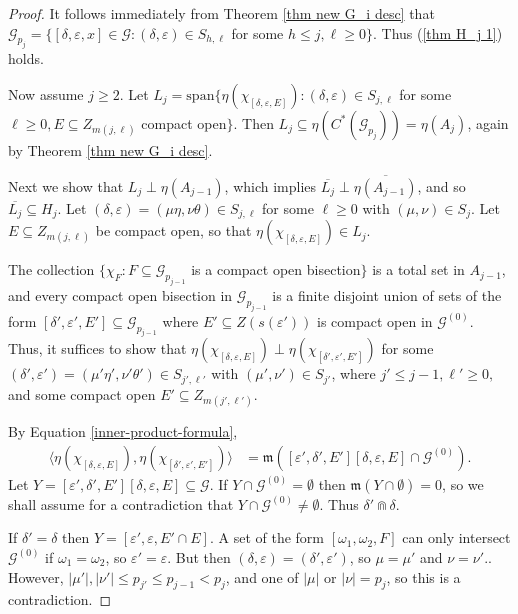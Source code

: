 \documentclass[12pt]{amsart}
\newcommand{\sse}{\subseteq}
\newcommand{\spn}{\text{span}}
\newcommand{\mc}[1]{\mathcal{#1}}
\newcommand{\mf}[1]{\mathfrak{#1}}
\newcommand{\emp}{\emptyset}
\newcommand{\de}{\delta}
\newcommand{\ep}{\varepsilon}
\renewcommand{\th}{\theta}
\newcommand{\om}{\omega}
\theoremstyle{plain} %
\theoremstyle{definition} %
\begin{document}
\begin{proof}
It follows immediately from Theorem \ref{thm new G_i desc} that $\mc{G}_{p_j} = \{ [\de, \ep, x] \in \mc{G} : (\de, \ep) \in S_{h, \ell}$ for some $h \le j, \ell \ge 0\}$. Thus (\ref{thm H_j 1}) holds.

Now assume $j \ge 2$.
Let $L_j = \spn\{\eta(\chi_{[\de, \ep, E]}) : (\de, \ep) \in S_{j,\ell}$ for some $ \ell \ge 0, E \sse Z_{m(j,\ell)} $ compact open$\}.$ 
    Then $L_j \sse \eta(C^*(\mc{G}_{p_j})) = \eta(A_{j})$, again by Theorem \ref{thm new G_i desc}.
    

    Next we show that $L_j \perp \eta(A_{j-1})$, which implies $\overline{L_j} \perp \overline{\eta(A_{j-1})}$, and so $\overline{L_j} \sse H_j$. 
    Let $(\de, \ep) = (\mu\eta, \nu\th) \in S_{j,\ell}$ for some $\ell \ge 0$ with $(\mu, \nu) \in S_{j}$. Let $E \sse Z_{m(j,\ell)}$ be compact open, so that $\eta(\chi_{[\de, \ep, E]}) \in L_j$. 

    The collection $\{\chi_{F} : F \sse \mc{G}_{p_{j-1}}$ is a compact open bisection$\}$ is a total set in $A_{j-1}$, and every compact open bisection in $\mc{G}_{p_{j-1}}$ is a finite disjoint union of sets of the form $[\de', \ep', E'] \sse \mc{G}_{p_{j-1}}$ where $E' \sse Z(s(\ep'))$ is compact open in $\mc{G}^{(0)}$. Thus, it suffices to show that $\eta(\chi_{[\de, \ep, E]}) \perp \eta(\chi_{[\de', \ep', E']})$ for some $(\de', \ep') = (\mu'\eta', \nu'\th') \in S_{j', \ell'}$  with $(\mu', \nu') \in S_{j'}$, where $j' \le j-1, \ell' \ge 0,$  and some compact open $E' \sse Z_{m(j',\ell')}$.

    By Equation \eqref{inner-product-formula},
    \begin{align*}
        \langle \eta(\chi_{[\de, \ep, E]}), \eta(\chi_{[\de', \ep', E']}) \rangle &= \mf{m}([\ep', \de', E'][\de, \ep, E] \cap \mc{G}^{(0)}).
    \end{align*}
    Let $Y = [\ep', \de', E'][\de, \ep, E] \sse \mc{G}$. If $Y \cap \mc{G}^{(0)} = \emp$ then $\mf{m}(Y \cap \emp) = 0$, so we shall assume for a contradiction that $Y \cap \mc{G}^{(0)} \neq \emp$. Thus $\de' \Cap \de$.

    If $\de' = \de$ then $Y =[\ep', \ep, E'\cap E]$. A set of the form $[\om_1, \om_2, F]$ can only intersect $\mc{G}^{(0)}$ if $\om_1 = \om_2$, so $\ep' = \ep$. But then $(\de, \ep) = (\de', \ep')$, so $\mu = \mu'$ and $\nu = \nu'$.. However, $|\mu'|, |\nu'| \le p_{j'} \le p_{j-1} < p_j$, and one of $|\mu|$ or $|\nu| = p_j$, so this is a contradiction.
    

\end{proof}
\end{document}
